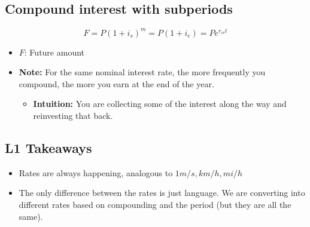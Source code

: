 \subsection{Compound interest with subperiods}
\begin{definition}
    \begin{equation}
        F = P(1 + i_s)^{m} = P(1 + i_e) = Pe^{r_{cc}t}
    \end{equation}
    \begin{itemize}
        \item \(F\): Future amount 
        \item \textbf{Note:} For the same nominal interest rate, the more frequently you compound, the more you earn at the end of the year.
        \begin{itemize}
            \item \textbf{Intuition:} You are collecting some of the interest along the way and reinvesting that back.
        \end{itemize}
    \end{itemize}
\end{definition}


\subsection{L1 Takeaways}

\begin{intuition}
    \begin{itemize}
        \item Rates are always happening, analogous to $1m/s,km/h,mi/h$
        \item The only difference between the rates is just language. We are converting into different rates based on compounding and the period (but they are all the same).
    \end{itemize}
\end{intuition}

